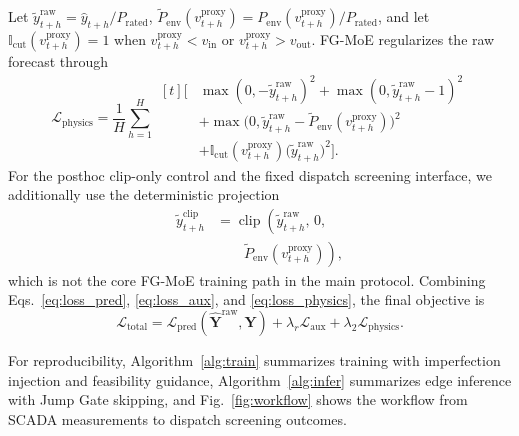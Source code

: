 ﻿\documentclass[review,1p,times]{elsarticle}
\begin{document}
Let $\tilde y_{t+h}^{\mathrm{raw}}=\hat y_{t+h}/P_{\mathrm{rated}}$, $\tilde P_{\mathrm{env}}(v_{t+h}^{\mathrm{proxy}})=P_{\mathrm{env}}(v_{t+h}^{\mathrm{proxy}})/P_{\mathrm{rated}}$, and let $\mathbb{I}_{\mathrm{cut}}(v_{t+h}^{\mathrm{proxy}})=1$ when $v_{t+h}^{\mathrm{proxy}}<v_{\mathrm{in}}$ or $v_{t+h}^{\mathrm{proxy}}>v_{\mathrm{out}}$. FG-MoE regularizes the raw forecast through
\begin{equation}
\mathcal{L}_{\text{physics}}=
\frac{1}{H}\sum_{h=1}^{H}
\begin{aligned}[t]
\Big[&
\max(0,-\tilde y_{t+h}^{\mathrm{raw}})^2
+\max(0,\tilde y_{t+h}^{\mathrm{raw}}-1)^2 \\
&+\max\!\big(0,\tilde y_{t+h}^{\mathrm{raw}}-\tilde P_{\mathrm{env}}(v_{t+h}^{\mathrm{proxy}})\big)^2 \\
&+\mathbb{I}_{\mathrm{cut}}(v_{t+h}^{\mathrm{proxy}})\big(\tilde y_{t+h}^{\mathrm{raw}}\big)^2
\Big].
\end{aligned}
\label{eq:loss_physics}
\end{equation}
For the posthoc clip-only control and the fixed dispatch screening interface, we additionally use the deterministic projection
\begin{equation}
\begin{aligned}
\tilde y_{t+h}^{\mathrm{clip}}
&=\operatorname{clip}\!\left(\tilde y_{t+h}^{\mathrm{raw}},\,0,\right.\\
&\qquad\left.\tilde P_{\mathrm{env}}(v_{t+h}^{\mathrm{proxy}})\right),
\end{aligned}
\label{eq:fg_clip}
\end{equation}
which is not the core FG-MoE training path in the main protocol. Combining Eqs.~\eqref{eq:loss_pred}, \eqref{eq:loss_aux}, and \eqref{eq:loss_physics}, the final objective is
\begin{equation}
\mathcal{L}_{\text{total}}
=\mathcal{L}_{\text{pred}}(\hat{\mathbf{Y}}^{\mathrm{raw}},\mathbf{Y})
+\lambda_r\mathcal{L}_{\text{aux}}
+\lambda_2\mathcal{L}_{\text{physics}}.
\label{eq:loss_total}
\end{equation}


For reproducibility, Algorithm~\ref{alg:train} summarizes training with imperfection injection and feasibility guidance, Algorithm~\ref{alg:infer} summarizes edge inference with Jump Gate skipping, and Fig.~\ref{fig:workflow} shows the workflow from SCADA measurements to dispatch screening outcomes.\label{sec:algo_summary}
\end{document}

